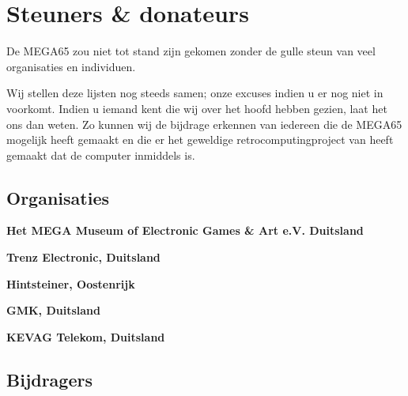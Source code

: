 \chapter{Steuners \& donateurs}


De MEGA65 zou niet tot stand zijn gekomen zonder de gulle steun van veel organisaties en individuen.

Wij stellen deze lijsten nog steeds samen; onze excuses indien u er nog niet in voorkomt. Indien u iemand kent die wij over het hoofd hebben gezien, laat het ons dan weten. Zo kunnen wij de bijdrage erkennen van iedereen die de MEGA65 mogelijk heeft gemaakt en die er het geweldige retrocomputingproject van heeft gemaakt dat de computer inmiddels is.

\section{Organisaties}

{\bf Het MEGA Museum of Electronic Games \& Art e.V. Duitsland} \\

{\bf Trenz Electronic, Duitsland} \\

{\bf Hintsteiner, Oostenrijk} \\

{\bf GMK, Duitsland} \\

{\bf KEVAG Telekom, Duitsland} \\

\newpage
\section{Bijdragers}

